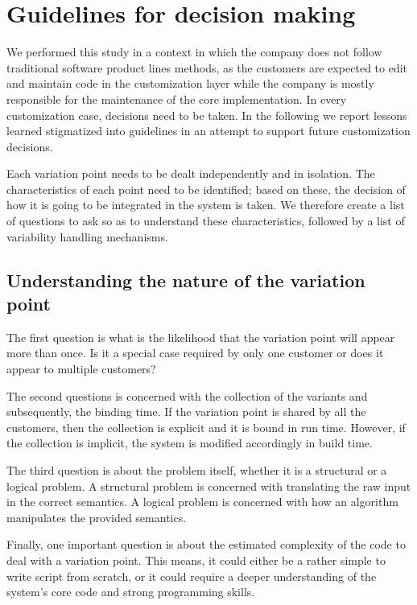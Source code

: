\section{Guidelines for decision making} 

We performed this study in a context in which the company does not follow traditional software product lines methods, as the customers are expected to edit and maintain code in the customization layer while the company is mostly responsible for the  maintenance of the core implementation. In every customization case, decisions need to be taken. In the following we report lessons learned stigmatized into guidelines in an attempt to support future customization decisions.

Each variation point needs to be dealt independently and in isolation. The characteristics of each point need to be identified; based on these, the decision of how it is going to be integrated in the system is taken. We therefore create a list of questions to ask so as to understand these characteristics, followed by a list of variability handling mechanisms. 

\subsection{Understanding the nature of the variation point} 

The first question is what is the likelihood that the variation point will appear more than once. Is it a special case required by only one customer or does it appear to multiple customers? 

The second questions is concerned with the collection of the variants and subsequently, the binding time. If the variation point is shared by all the customers, then the collection is explicit and it is bound in run time. 
However, if the collection is implicit, the system is modified accordingly in build time.

The third question is about the problem itself, whether it is a structural or a logical problem. A structural problem is concerned with translating the raw input in the correct semantics. A logical problem is concerned with how an algorithm manipulates the provided semantics.

Finally, one important question is about the estimated complexity of the code to deal with a variation point. This means, it could either be a rather simple to write script from scratch, or it could require a deeper understanding of the system's core code and strong programming skills.


